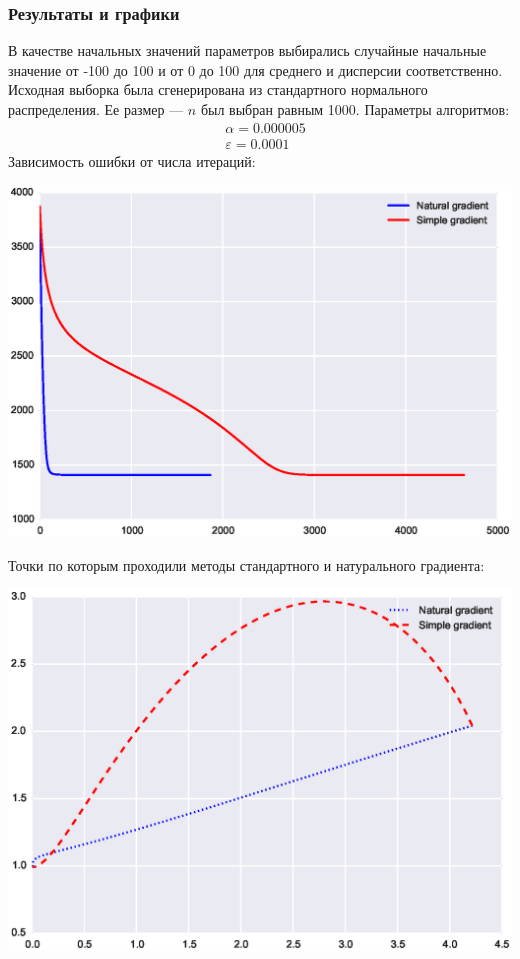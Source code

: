 \documentclass[a4paper,12pt]{article}
\begin{document}
        \newpage

\subsubsection{Результаты и графики}

        В качестве начальных значений параметров выбирались случайные начальные значение от -100 до 100 и от 0 до 100 для среднего и дисперсии соответственно.
        Исходная выборка была сгенерирована из стандартного нормального распределения. Ее размер --- $n$ был выбран равным 1000.
        Параметры алгоритмов:
        $$
            \begin{aligned}
                & \alpha = 0.000005 \\
                & \varepsilon = 0.0001
            \end{aligned}
        $$
        Зависимость ошибки от числа итераций:
        \begin{flushleft}
            \includegraphics[scale=0.8, trim=1.5cm 0 0 0]{figure_5}
        \end{flushleft}

        \newpage

        Точки по которым проходили методы стандартного и натурального градиента:
        \begin{flushleft}
            \includegraphics[scale=0.8, trim=1.5cm 0 0 0]{figure_55}
        \end{flushleft}
\end{document}
